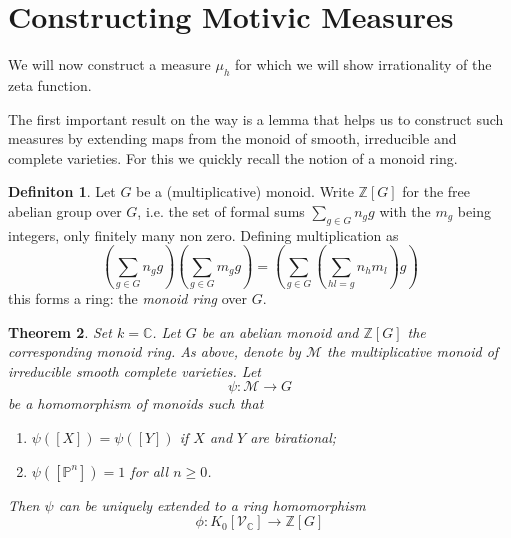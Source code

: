 \documentclass[11pt, a4paper, german]{article}
\theoremstyle{plain}
\newtheorem{theorem}{Theorem}[section]
\theoremstyle{definition}
\newtheorem{definition}[theorem]{Definiton}
\newcommand{\gring}[1][k]{K_0[\mathcal{V}_#1]}
\begin{document}
\section{Constructing Motivic Measures}

We will now construct a measure $\mu_h$ for which we will show irrationality of the zeta function.

The first important result on the way is a lemma that helps us to construct such measures by extending maps from the monoid of smooth, irreducible
and complete varieties. For this we quickly recall the notion of a monoid ring.

\begin{definition}
    Let $G$ be a (multiplicative) monoid. Write $\mathbb{Z}[G]$ for the free abelian group over $G$, i.e. the set of formal sums
    $\sum_{g \in G} n_g g$ with the $m_g$ being integers, only finitely many non zero.
    Defining multiplication as
    \[
        (\sum_{g \in G} n_g g)(\sum_{g \in G} m_g g) = (\sum_{g \in G} (\sum_{hl = g} n_h m_l) g)
    \]
    this forms a ring: the \emph{monoid ring} over $G$.
\end{definition}

\begin{theorem}
    \label{th1}
    Set $k = \mathbb{C}$. Let $G$ be an abelian monoid and $\mathbb{Z}[G]$ the corresponding monoid ring. As above, denote
    by $\mathcal{M}$ the multiplicative monoid of irreducible smooth complete varieties. Let
    \[
        \psi: \mathcal{M} \to G
    \]
    be a homomorphism of monoids such that
    \begin{enumerate}
        \item $\psi([X]) = \psi([Y])$ if $X$ and $Y$ are birational;
        \item $\psi([\mathbb{P}^n]) = 1$ for all $n \ge 0$.
    \end{enumerate}
    Then $\psi$ can be uniquely extended to a ring homomorphism 
    \[
        \phi: \gring[\mathbb{C}] \to \mathbb{Z} [G]
    \]
\end{theorem}
\end{document}
